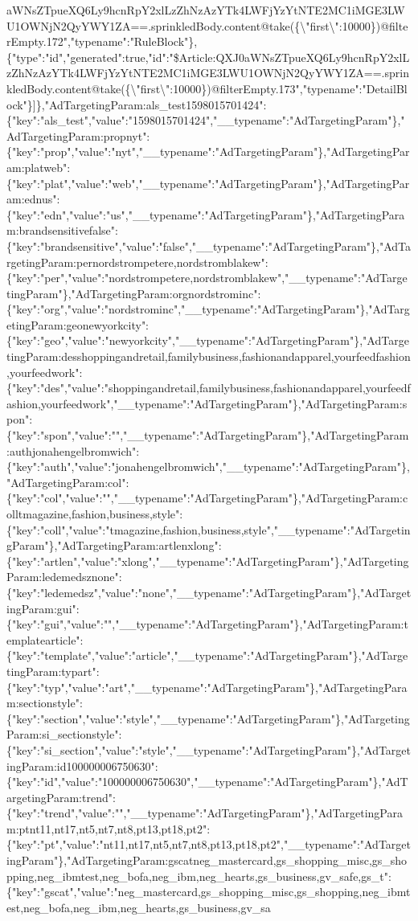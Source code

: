aWNsZTpueXQ6Ly9hcnRpY2xlLzZhNzAzYTk4LWFjYzYtNTE2MC1iMGE3LWU1OWNjN2QyYWY1ZA==.sprinkledBody.content@take(\{\textbackslash{}"first\textbackslash{}":10000\})@filterEmpty.172","typename":"RuleBlock"\},\{"type":"id","generated":true,"id":"\$Article:QXJ0aWNsZTpueXQ6Ly9hcnRpY2xlLzZhNzAzYTk4LWFjYzYtNTE2MC1iMGE3LWU1OWNjN2QyYWY1ZA==.sprinkledBody.content@take(\{\textbackslash{}"first\textbackslash{}":10000\})@filterEmpty.173","typename":"DetailBlock"\}{]}\},"AdTargetingParam:als\_test1598015701424":\{"key":"als\_test","value":"1598015701424","\_\_typename":"AdTargetingParam"\},"AdTargetingParam:propnyt":\{"key":"prop","value":"nyt","\_\_typename":"AdTargetingParam"\},"AdTargetingParam:platweb":\{"key":"plat","value":"web","\_\_typename":"AdTargetingParam"\},"AdTargetingParam:ednus":\{"key":"edn","value":"us","\_\_typename":"AdTargetingParam"\},"AdTargetingParam:brandsensitivefalse":\{"key":"brandsensitive","value":"false","\_\_typename":"AdTargetingParam"\},"AdTargetingParam:pernordstrompetere,nordstromblakew":\{"key":"per","value":"nordstrompetere,nordstromblakew","\_\_typename":"AdTargetingParam"\},"AdTargetingParam:orgnordstrominc":\{"key":"org","value":"nordstrominc","\_\_typename":"AdTargetingParam"\},"AdTargetingParam:geonewyorkcity":\{"key":"geo","value":"newyorkcity","\_\_typename":"AdTargetingParam"\},"AdTargetingParam:desshoppingandretail,familybusiness,fashionandapparel,yourfeedfashion,yourfeedwork":\{"key":"des","value":"shoppingandretail,familybusiness,fashionandapparel,yourfeedfashion,yourfeedwork","\_\_typename":"AdTargetingParam"\},"AdTargetingParam:spon":\{"key":"spon","value":"","\_\_typename":"AdTargetingParam"\},"AdTargetingParam:authjonahengelbromwich":\{"key":"auth","value":"jonahengelbromwich","\_\_typename":"AdTargetingParam"\},"AdTargetingParam:col":\{"key":"col","value":"","\_\_typename":"AdTargetingParam"\},"AdTargetingParam:colltmagazine,fashion,business,style":\{"key":"coll","value":"tmagazine,fashion,business,style","\_\_typename":"AdTargetingParam"\},"AdTargetingParam:artlenxlong":\{"key":"artlen","value":"xlong","\_\_typename":"AdTargetingParam"\},"AdTargetingParam:ledemedsznone":\{"key":"ledemedsz","value":"none","\_\_typename":"AdTargetingParam"\},"AdTargetingParam:gui":\{"key":"gui","value":"","\_\_typename":"AdTargetingParam"\},"AdTargetingParam:templatearticle":\{"key":"template","value":"article","\_\_typename":"AdTargetingParam"\},"AdTargetingParam:typart":\{"key":"typ","value":"art","\_\_typename":"AdTargetingParam"\},"AdTargetingParam:sectionstyle":\{"key":"section","value":"style","\_\_typename":"AdTargetingParam"\},"AdTargetingParam:si\_sectionstyle":\{"key":"si\_section","value":"style","\_\_typename":"AdTargetingParam"\},"AdTargetingParam:id100000006750630":\{"key":"id","value":"100000006750630","\_\_typename":"AdTargetingParam"\},"AdTargetingParam:trend":\{"key":"trend","value":"","\_\_typename":"AdTargetingParam"\},"AdTargetingParam:ptnt11,nt17,nt5,nt7,nt8,pt13,pt18,pt2":\{"key":"pt","value":"nt11,nt17,nt5,nt7,nt8,pt13,pt18,pt2","\_\_typename":"AdTargetingParam"\},"AdTargetingParam:gscatneg\_mastercard,gs\_shopping\_misc,gs\_shopping,neg\_ibmtest,neg\_bofa,neg\_ibm,neg\_hearts,gs\_business,gv\_safe,gs\_t":\{"key":"gscat","value":"neg\_mastercard,gs\_shopping\_misc,gs\_shopping,neg\_ibmtest,neg\_bofa,neg\_ibm,neg\_hearts,gs\_business,gv\_sa